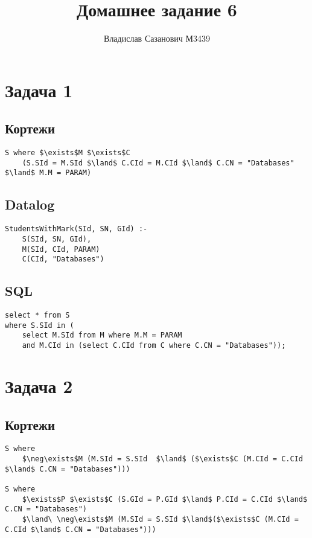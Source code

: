 \documentclass{article}
\title{Домашнее задание 6}
\author{Владислав Сазанович М3439}
\date{}
\begin{document}
\maketitle



\section{Задача 1}

\subsection{Кортежи}
\begin{lstlisting}[mathescape=true]
S where $\exists$M $\exists$C
    (S.SId = M.SId $\land$ C.CId = M.CId $\land$ C.CN = "Databases" $\land$ M.M = PARAM)
\end{lstlisting}

\subsection{Datalog}
\begin{lstlisting}[mathescape=true]
StudentsWithMark(SId, SN, GId) :-
    S(SId, SN, GId),
    M(SId, CId, PARAM)
    C(CId, "Databases")
\end{lstlisting}

\subsection{SQL}
\begin{lstlisting}
select * from S
where S.SId in (
    select M.SId from M where M.M = PARAM
    and M.CId in (select C.CId from C where C.CN = "Databases"));
\end{lstlisting}



\section{Задача 2}

\subsection{Кортежи}
\begin{lstlisting}[mathescape=true]
S where
    $\neg\exists$M (M.SId = S.SId  $\land$ ($\exists$C (M.CId = C.CId $\land$ C.CN = "Databases")))

S where
    $\exists$P $\exists$C (S.GId = P.GId $\land$ P.CId = C.CId $\land$ C.CN = "Databases")
    $\land\ \neg\exists$M (M.SId = S.SId $\land$($\exists$C (M.CId = C.CId $\land$ C.CN = "Databases")))

\end{lstlisting}
\end{document}
